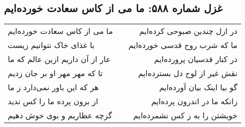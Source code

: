 \begin{center}
\section*{غزل شماره ۵۸۸: ما می از کاس سعادت خورده‌ایم}
\label{sec:588}
\begin{longtable}{l p{0.5cm} r}
ما می از کاس سعادت خورده‌ایم
&&
در ازل چندین صبوحی کرده‌ایم
\\
با غذای خاک نتوانیم زیست
&&
ما که شرب روح قدسی خورده‌ایم
\\
عار از آن داریم ازین عالم که ما
&&
در کنار قدسیان پرورده‌ایم
\\
تا که مهر مهر او بر جان زدیم
&&
نقش غیر از لوح دل بسترده‌ایم
\\
هر که این باور نمی‌دارد ز ما
&&
گو بیا اینک بیان آورده‌ایم
\\
از برون پرده ما را کس ندید
&&
زانکه ما در اندرون پرده‌ایم
\\
گرچه عطاریم و بوی خوش دهیم
&&
خویشتن را به ز کس نشمرده‌ایم
\\
\end{longtable}
\end{center}
